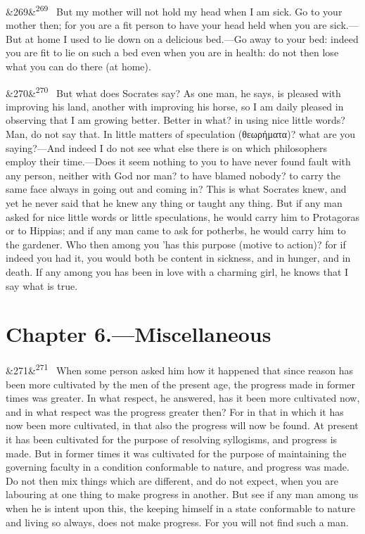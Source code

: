 \documentclass[12pt]{article}
\newcommand{\para}[1][]{\par\noindent\ifx&#1&\else\textsuperscript{\footnotesize #1}~\fi}
\begin{document}
\para[269] But my mother will not hold my head when I am sick. Go to your mother then; for you are a fit person to have your head held when you are sick.—But at home I used to lie down on a delicious bed.—Go away to your bed: indeed you are fit to lie on such a bed even when you are in health: do not then lose what you can do there (at home).

\para[270] But what does Socrates say? As one man, he says, is pleased with improving his land, another with improving his horse, so I am daily pleased in observing that I am growing better. Better in what? in using nice little words? Man, do not say that. In little matters of speculation (θεωρήματα)? what are you saying?—And indeed I do not see what else there is on which philosophers employ their time.—Does it seem nothing to you to have never found fault with any person, neither with God nor man? to have blamed nobody? to carry the same face always in going out and coming in? This is what Socrates knew, and yet he never said that he knew any thing or taught any thing. But if any man asked for nice little words or little speculations, he would carry him to Protagoras or to Hippias; and if any man came to ask for potherbs, he would carry him to the gardener. Who then among you 'has this purpose (motive to action)? for if indeed you had it, you would both be content in sickness, and in hunger, and in death. If any among you has been in love with a charming girl, he knows that I say what is true.

\section*{Chapter 6.---Miscellaneous}

\para[271] When some person asked him how it happened that since reason has been more cultivated by the men of the present age, the progress made in former times was greater. In what respect, he answered, has it been more cultivated now, and in what respect was the progress greater then? For in that in which it has now been more cultivated, in that also the progress will now be found. At present it has been cultivated for the purpose of resolving syllogisms, and progress is made. But in former times it was cultivated for the purpose of maintaining the governing faculty in a condition conformable to nature, and progress was made. Do not then mix things which are different, and do not expect, when you are labouring at one thing to make progress in another. But see if any man among us when he is intent upon this, the keeping himself in a state conformable to nature and living so always, does not make progress. For you will not find such a man.
\end{document}
